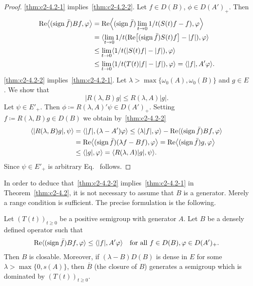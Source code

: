 \begin{proof}
\ref{thm:c2-4.2-1}   implies~\ref{thm:c2-4.2-2}. Let $f \in D(B)$, $\phi \in D(A')_{+}$. Then
\begin{align*}
\Re\mleft\langle(\sign  \bar{f})Bf, \phi\mright\rangle &= 
\Re \mleft\langle(\sign  \bar{f})\lim_{t \to 0}1/t(S(t)f - f),\phi\mright\rangle\\
&= \langle\lim_{t \to 0}1/t(\Re\mleft[(\sign  \bar{f}) S(t)f\mright] - |f|),\phi\rangle\\
&\leq \lim_{t \to 0}\langle 1/t(|S(t)f| - |f|),\phi\rangle\\
&\leq \lim_{t \to 0}\langle 1/t(T(t)|f| - |f|),\phi\rangle = \langle|f|,A'\phi\rangle.
\end{align*}
\ref{thm:c2-4.2-2}   implies~\ref{thm:c2-4.2-1}. 
Let $\lambda > \max\{\omega_{0}(A),\omega_{0}(B)\}$ and $g \in E$. 
We show that
\begin{equation}\label{eq:c2-4.3}
|R(\lambda,B)g| \leq R(\lambda,A)|g|.
\end{equation}
Let $\psi \in E'_{+}$. Then $\phi \coloneq R(\lambda,A)'\psi \in D(A')_{+}$.
Setting $f \coloneq R(\lambda,B)g \in D(B)$ we obtain by~\ref{thm:c2-4.2-2}  
\begin{align*}
\langle|R(\lambda,B)g|,\psi\rangle &= \langle|f|,(\lambda-A')\phi\rangle \leq \langle\lambda|f|,\phi\rangle - \Re\langle(\sign  \bar{f})Bf,\phi\rangle\\
&= \Re\mleft\langle(\sign  \bar{f})(\lambda f - Bf),\phi\mright\rangle 
= \Re\mleft\langle(\sign  \bar{f})g,\phi\mright\rangle \\
&\leq \mleft\langle|g|,\phi\mright\rangle = \langle R(\lambda,A)|g|,\psi\rangle .
\end{align*}
Since $\psi \in E'_{+}$ is arbitrary Eq.~ follows.
\end{proof}
In order to deduce that~\ref{thm:c2-4.2-2}   implies~\ref{thm:c2-4.2-1}   in Theorem~\ref{thm:c2-4.2}, it is not
necessary to assume that $B$ is a generator. 
Merely a range condition is sufficient. 
The precise formulation is the following.
\begin{theorem}\label{thm:c2-4.3}
Let $(T(t))_{t \geq 0}$ be a positive semigroup with generator $A$. 
Let $B$ be a densely defined operator such that
\begin{equation}\label{eq:c2-4.4}
\Re\langle(\sign  \bar{f})Bf,\phi\rangle \leq \langle|f|,A'\phi\rangle
\quad\text{for all } f \in D(B), \phi \in D(A')_{+} .
\end{equation}
Then $B$ is closable. 
Moreover, if\/ $(\lambda - B)D(B)$ is dense in $E$ for some $\lambda > \max\{0,s(A)\}$, then $\overline{B}$ (the closure of\/ $B$) generates a
semigroup which is dominated by $(T(t))_{t \geq 0}$.
\end{theorem}
